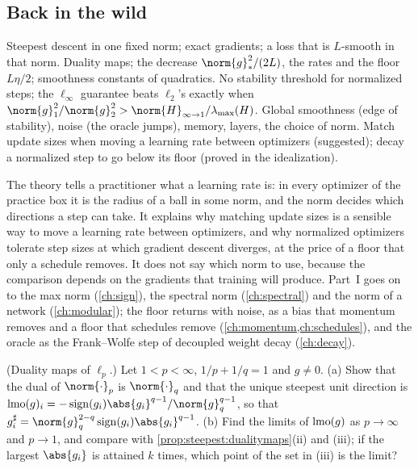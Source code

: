 \begin{refsection}
\section{Back in the wild}\label{sec:steepest:back}

{Steepest descent in one fixed norm; exact gradients; a loss that is $L$-smooth in that norm.}
{Duality maps; the decrease $\norm{g}_*^2/(2L)$, the rates and the floor $L\eta/2$; smoothness constants of quadratics.}
{No stability threshold for normalized steps; the $\ell_\infty$ guarantee beats $\ell_2$'s exactly when $\norm{g}_1^2/\norm{g}_2^2>\norm{H}_{\infty\to1}/\lmax(H)$.}
{Global smoothness (edge of stability), noise (the oracle jumps), memory, layers, the choice of norm.}
{Match update sizes when moving a learning rate between optimizers (suggested); decay a normalized step to go below its floor (proved in the idealization).}

The theory tells a practitioner what a learning rate is: in every optimizer of the practice box it is the radius of a ball in some norm, and the norm decides which directions a step can take. It explains why matching update sizes is a sensible way to move a learning rate between optimizers, and why normalized optimizers tolerate step sizes at which gradient descent diverges, at the price of a floor that only a schedule removes. It does not say which norm to use, because the comparison depends on the gradients that training will produce. Part~I goes on to the max norm (\cref{ch:sign}), the spectral norm (\cref{ch:spectral}) and the norm of a network (\cref{ch:modular}); the floor returns with noise, as a bias that momentum removes and a floor that schedules remove (\cref{ch:momentum,ch:schedules}), and the oracle as the Frank--Wolfe step of decoupled weight decay (\cref{ch:decay}).

\begin{exercises}
\item \consolidation (Duality maps of $\ell_p$.) Let $1<p<\infty$, $1/p+1/q=1$ and $g\ne0$. (a) Show that the dual of $\norm{\cdot}_p$ is $\norm{\cdot}_q$ and that the unique steepest unit direction is $\lmo(g)_i=-\sign(g_i)\abs{g_i}^{q-1}/\norm{g}_q^{q-1}$, so that $g^\sharp_i=\norm{g}_q^{2-q}\sign(g_i)\abs{g_i}^{q-1}$. (b) Find the limits of $\operatorname{lmo}(g)$ as $p\to\infty$ and $p\to1$, and compare with \cref{prop:steepest:dualitymaps}(ii) and (iii); if the largest $\abs{g_i}$ is attained $k$ times, which point of the set in (iii) is the limit? \label{ex:steepest:lp}


\end{exercises}
\end{refsection}
